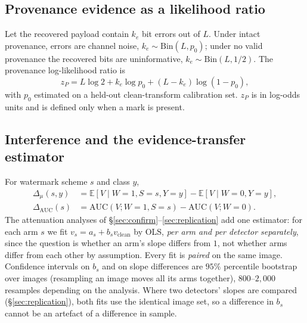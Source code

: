 \documentclass[journal]{IEEEtran}
\begin{document}
\subsection{Provenance evidence as a likelihood ratio}
Let the recovered payload contain $k_e$ bit errors out of $L$. Under intact
provenance, errors are channel noise, $k_e \sim \mathrm{Bin}(L, p_0)$; under no
valid provenance the recovered bits are uninformative, $k_e \sim
\mathrm{Bin}(L, 1/2)$. The provenance log-likelihood ratio is
\begin{equation}
  z_P = L\log 2 + k_e \log p_0 + (L - k_e)\log(1-p_0),
  \label{eq:zp}
\end{equation}
with $p_0$ estimated on a held-out clean-transform calibration set. $z_P$ is in
log-odds units and is defined only when a mark is present.

\subsection{Interference and the evidence-transfer estimator}
For watermark scheme $s$ and class $y$,
\begin{align}
  \Delta_\mu(s,y)   &= \mathbb{E}[V \mid W{=}1, S{=}s, Y{=}y] - \mathbb{E}[V \mid W{=}0, Y{=}y],\\
  \Delta_{\mathrm{AUC}}(s) &= \mathrm{AUC}(V; W{=}1, S{=}s) - \mathrm{AUC}(V; W{=}0).
\end{align}
The attenuation analyses of \S\ref{sec:confirm}--\ref{sec:replication} add one
estimator: for each arm $s$ we fit $v_s = a_s + b_s v_{\text{clean}}$ by OLS,
\emph{per arm and per detector separately}, since the question is whether an
arm's slope differs from $1$, not whether arms differ from each other by
assumption. Every fit is \emph{paired} on the same image. Confidence intervals
on $b_s$ and on slope differences are $95\%$ percentile bootstrap over images
(resampling an image moves all its arms together), $800$--$2{,}000$ resamples
depending on the analysis. Where two detectors' slopes are compared
(\S\ref{sec:replication}), both fits use the identical image set, so a
difference in $b_s$ cannot be an artefact of a difference in sample.
\end{document}
